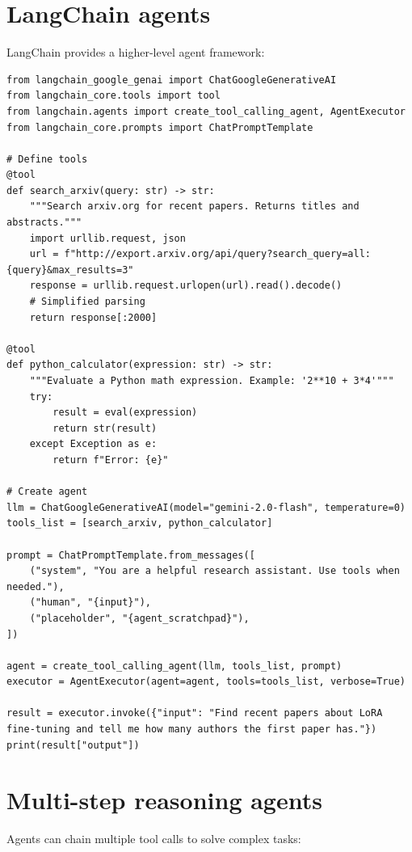 \section{LangChain agents}

LangChain provides a higher-level agent framework:

\begin{verbatim}
from langchain_google_genai import ChatGoogleGenerativeAI
from langchain_core.tools import tool
from langchain.agents import create_tool_calling_agent, AgentExecutor
from langchain_core.prompts import ChatPromptTemplate

# Define tools
@tool
def search_arxiv(query: str) -> str:
    """Search arxiv.org for recent papers. Returns titles and abstracts."""
    import urllib.request, json
    url = f"http://export.arxiv.org/api/query?search_query=all:{query}&max_results=3"
    response = urllib.request.urlopen(url).read().decode()
    # Simplified parsing
    return response[:2000]

@tool
def python_calculator(expression: str) -> str:
    """Evaluate a Python math expression. Example: '2**10 + 3*4'"""
    try:
        result = eval(expression)
        return str(result)
    except Exception as e:
        return f"Error: {e}"

# Create agent
llm = ChatGoogleGenerativeAI(model="gemini-2.0-flash", temperature=0)
tools_list = [search_arxiv, python_calculator]

prompt = ChatPromptTemplate.from_messages([
    ("system", "You are a helpful research assistant. Use tools when needed."),
    ("human", "{input}"),
    ("placeholder", "{agent_scratchpad}"),
])

agent = create_tool_calling_agent(llm, tools_list, prompt)
executor = AgentExecutor(agent=agent, tools=tools_list, verbose=True)

result = executor.invoke({"input": "Find recent papers about LoRA fine-tuning and tell me how many authors the first paper has."})
print(result["output"])
\end{verbatim}

\section{Multi-step reasoning agents}

Agents can chain multiple tool calls to solve complex tasks:

